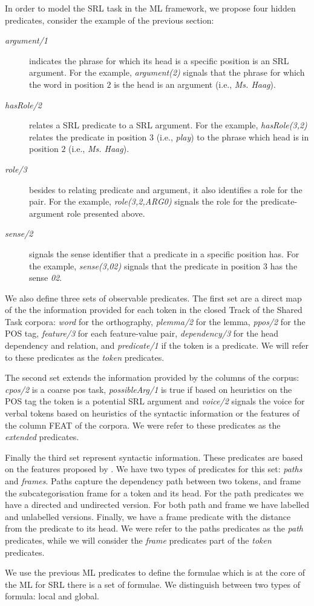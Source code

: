 
In order to model the SRL task in the ML framework, we propose four hidden 
predicates, consider the example of the previous section:
\begin{description}
    \item [\emph{argument/1}] indicates the phrase for which its head is a 
        specific position is an SRL argument. For the example,     
        \emph{argument(2)} signals that the phrase for which the word in 
        position $2$ is the head is an argument (i.e., \emph{Ms. Haag}).
    \item [\emph{hasRole/2}] relates a SRL predicate to a SRL argument. For the 
        example, \emph{hasRole(3,2)} relates the
        predicate in position $3$ (i.e., \emph{play}) to the phrase which head 
        is in position $2$ (i.e., \emph{Ms. Haag}).
    \item [\emph{role/3}] besides to relating predicate and argument, it also
        identifies a role for the pair. For the example,
        \emph{role(3,2,ARG0)} signals the role for the predicate-argument role 
        presented above.
    \item [\emph{sense/2}] signals the sense identifier that a predicate in a
        specific position has. For the example, \emph{sense(3,02)}
        signals that the predicate in position $3$ has the sense \emph{02}.
\end{description}

We also define three sets of observable predicates. The first set are a direct 
map of the the information provided for each token in the closed Track of the 
Shared Task corpora:  \emph{word} for the orthography, \emph{plemma/2} for the 
lemma, \emph{ppos/2} for the POS tag, \emph{feature/3} for each feature-value 
pair, \emph{dependency/3} for the head dependency and relation, and 
\emph{predicate/1} if the token is a predicate. We will refer to these 
predicates as the \emph{token} predicates.

The second set extends the information provided by the columns of the corpus: 
\emph{cpos/2} is a coarse pos task, \emph{possibleArg/1} is true if based 
on heuristics on the POS tag the token is a potential SRL argument and 
\emph{voice/2} signals the voice for verbal tokens based on heuristics of the 
syntactic information or the features of the column FEAT of the corpora. We 
were refer to these predicates as the \emph{extended} predicates.

Finally the third set represent syntactic information. These predicates are 
based on the features proposed by \citet{xue04calibrating}. We have two types of 
predicates for this set: \emph{paths} and \emph{frames}.  Paths capture the 
dependency path between two tokens, and frame the subcategorisation frame for a 
token and its head. For the path predicates we have a directed and undirected 
version. For both path and frame we have labelled and unlabelled versions.  
Finally, we have a frame predicate with the distance from the predicate to its 
head.  We were refer to the paths predicates as the \emph{path} predicates, 
while we will consider the \emph{frame} predicates part of the \emph{token} 
predicates.


We use the previous ML predicates to define the formulae which is at the core of 
the ML for SRL there is a set of formulae.  We distinguish between two types of 
formula: local and global. 
